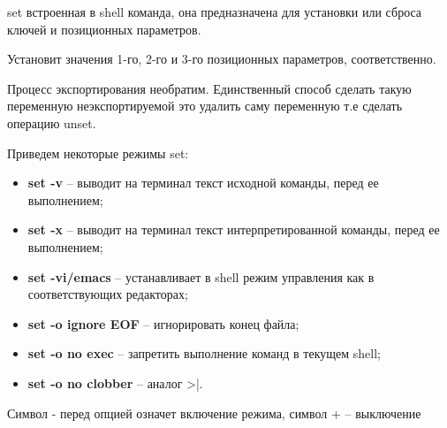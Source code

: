 \begin{defi}{set}
	встроенная в shell команда, она предназначена для установки или сброса ключей и позиционных параметров.
\end{defi}

Установит значения 1-го, 2-го и 3-го позиционных параметров, соответственно.

Процесс экспортирования необратим. Единственный способ сделать такую переменную неэкспортируемой это удалить саму переменную т.е сделать операцию unset.

Приведем некоторые режимы set:
\begin{itemize}
	\item \textbf{set -v} -- выводит на терминал текст исходной команды, перед ее выполнением;
	\item \textbf{set -x} -- выводит на терминал текст интерпретированной команды, перед ее выполнением;
	\item \textbf{set -vi/emacs} -- устанавливает в shell режим управления как в соответствующих редакторах;
	\item \textbf{set -o ignore EOF} -- игнорировать конец файла;
	\item \textbf{set -o no exec} -- запретить выполнение команд в текущем shell;
	\item \textbf{set -o no clobber} -- аналог >|.
\end{itemize}

\begin{important}
	Символ - перед опцией означет включение режима, символ + -- выключение
\end{important}
